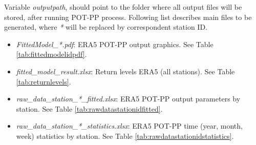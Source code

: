 \documentclass[12pt,twoside]{reedthesis}
\providecommand{\tightlist}{%
  \setlength{\itemsep}{0pt}\setlength{\parskip}{0pt}}
\begin{document}
Variable \emph{outputpath}, should point to the folder where all output files will be stored, after running POT-PP process. Following list describes main files to be generated, where \emph{*} will be replaced by correspondent station ID.
\begin{itemize}
\tightlist
\item
  \emph{FittedModel\_*.pdf}: ERA5 POT-PP output graphics. See Table \ref{tab:fittedmodelidpdf}.
\item
  \emph{fitted\_model\_result.xlsx}: Return levels ERA5 (all stations). See Table \ref{tab:returnlevels}.
\item
  \emph{raw\_data\_station\_*\_fitted.xlsx}: ERA5 POT-PP output parameters by station. See Table \ref{tab:rawdatastationidfitted}.
\item
  \emph{raw\_data\_station\_*\_statistics.xlsx}: ERA5 POT-PP time (year, month, week) statistics by station. See Table \ref{tab:rawdatastationidstatistics}.
\end{itemize}
\begingroup\fontsize{8}{10}\selectfont
\end{document}
